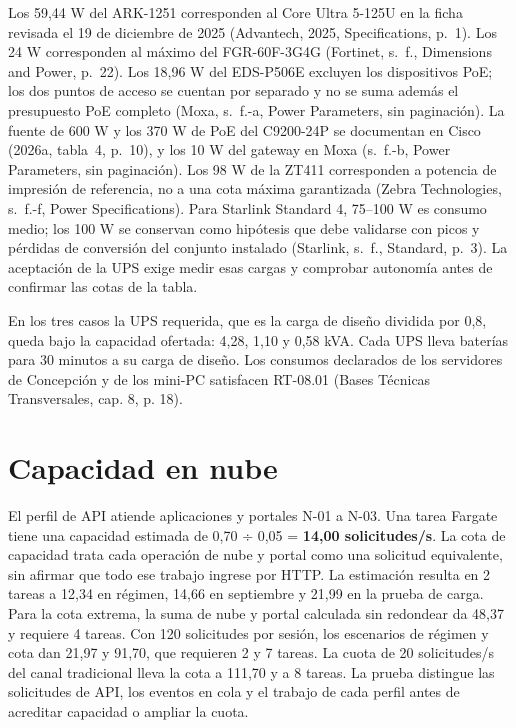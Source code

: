 Los 59,44 W del ARK-1251 corresponden al Core Ultra 5-125U en la ficha revisada el 19 de diciembre de 2025 (Advantech, 2025, Specifications, p.~1). Los 24 W corresponden al máximo del FGR-60F-3G4G (Fortinet, s.~f., Dimensions and Power, p.~22). Los 18,96 W del EDS-P506E excluyen los dispositivos PoE; los dos puntos de acceso se cuentan por separado y no se suma además el presupuesto PoE completo (Moxa, s.~f.-a, Power Parameters, sin paginación). La fuente de 600 W y los 370 W de PoE del C9200-24P se documentan en Cisco (2026a, tabla~4, p.~10), y los 10 W del gateway en Moxa (s.~f.-b, Power Parameters, sin paginación). Los 98 W de la ZT411 corresponden a potencia de impresión de referencia, no a una cota máxima garantizada (Zebra Technologies, s.~f.-f, Power Specifications). Para Starlink Standard 4, 75--100 W es consumo medio; los 100 W se conservan como hipótesis que debe validarse con picos y pérdidas de conversión del conjunto instalado (Starlink, s.~f., Standard, p.~3). La aceptación de la UPS exige medir esas cargas y comprobar autonomía antes de confirmar las cotas de la tabla.

En los tres casos la UPS requerida, que es la carga de diseño dividida por 0,8, queda bajo la capacidad ofertada: 4,28, 1,10 y 0,58 kVA. Cada UPS lleva baterías para 30 minutos a su carga de diseño. Los consumos declarados de los servidores de Concepción y de los mini-PC satisfacen RT-08.01 (Bases Técnicas Transversales, cap. 8, p. 18).

\section{Capacidad en nube}
\label{sec:anexo-4b-nube}

El perfil de API atiende aplicaciones y portales N-01 a N-03. Una tarea Fargate tiene una capacidad estimada de 0,70 ÷ 0,05 = \textbf{14,00 solicitudes/s}. La cota de capacidad trata cada operación de nube y portal como una solicitud equivalente, sin afirmar que todo ese trabajo ingrese por HTTP. La estimación resulta en 2 tareas a 12,34 en régimen, 14,66 en septiembre y 21,99 en la prueba de carga. Para la cota extrema, la suma de nube y portal calculada sin redondear da 48,37 y requiere 4 tareas. Con 120 solicitudes por sesión, los escenarios de régimen y cota dan 21,97 y 91,70, que requieren 2 y 7 tareas. La cuota de 20 solicitudes/s del canal tradicional lleva la cota a 111,70 y a 8 tareas. La prueba distingue las solicitudes de API, los eventos en cola y el trabajo de cada perfil antes de acreditar capacidad o ampliar la cuota.

